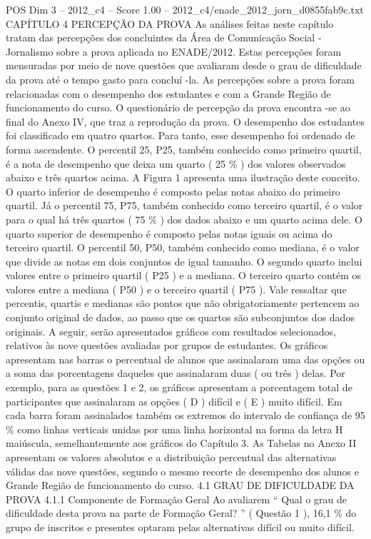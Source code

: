 \begin{textsample}{POS Dim 3 – 2012\_c4 – Score 1.00 – 2012\_c4/enade\_2012\_jorn\_d0855fab9c.txt}  \label{ex:f3_pos_151}
CAPÍTULO 4 PERCEPÇÃO DA PROVA As análises feitas neste capítulo tratam das percepções dos concluintes da Área de Comunicação Social - Jornalismo sobre a prova aplicada no ENADE/2012.
Estas percepções foram mensuradas por meio de nove questões que avaliaram desde o grau de dificuldade da prova até o tempo gasto para concluí -la.
As percepções sobre a prova foram relacionadas com o desempenho dos estudantes e com a Grande Região de funcionamento do curso.
O questionário de percepção da prova encontra -se ao final do Anexo IV, que traz a reprodução da prova.
O desempenho dos estudantes foi classificado em quatro quartos.
Para tanto, esse desempenho foi ordenado de forma ascendente.
O percentil 25, P25, também conhecido como primeiro quartil, é a nota de desempenho que deixa um quarto ( 25 \% ) dos valores observados abaixo e três quartos acima.
A Figura 1 apresenta uma ilustração deste conceito.
O quarto inferior de desempenho é composto pelas notas abaixo do primeiro quartil.
Já o percentil 75, P75, também conhecido como terceiro quartil, é o valor para o qual há três quartos ( 75 \% ) dos dados abaixo e um quarto acima dele.
O quarto superior de desempenho é composto pelas notas iguais ou acima do terceiro quartil.
O percentil 50, P50, também conhecido como mediana, é o valor que divide as notas em dois conjuntos de igual tamanho.
O segundo quarto inclui valores entre o primeiro quartil ( P25 ) e a mediana.
O terceiro quarto contém os valores entre a mediana ( P50 ) e o terceiro quartil ( P75 ).
Vale ressaltar que percentis, quartis e medianas são pontos que não obrigatoriamente pertencem ao conjunto original de dados, ao passo que os quartos são subconjuntos dos dados originais.
A seguir, serão apresentados gráficos com resultados selecionados, relativos às nove questões avaliadas por grupos de estudantes.
Os gráficos apresentam nas barras o percentual de alunos que assinalaram uma das opções ou a soma das porcentagens daqueles que assinalaram duas ( ou três ) delas.
Por exemplo, para as questões 1 e 2, os gráficos apresentam a porcentagem total de participantes que assinalaram as opções ( D ) difícil e ( E ) muito difícil.
Em cada barra foram assinalados também os extremos do intervalo de confiança de 95 \% como linhas verticais unidas por uma linha horizontal na forma da letra H maiúscula, semelhantemente aos gráficos do Capítulo 3.
As Tabelas no Anexo II apresentam os valores absolutos e a distribuição percentual das alternativas válidas das nove questões, segundo o mesmo recorte de desempenho dos alunos e Grande Região de funcionamento do curso. 4.1 GRAU DE DIFICULDADE DA PROVA 4.1.1 Componente de Formação Geral Ao avaliarem “ Qual o grau de dificuldade desta prova na parte de Formação Geral? ” ( Questão 1 ), 16,1 \% do grupo de inscritos e presentes optaram pelas alternativas difícil ou muito difícil.

\end{textsample}
